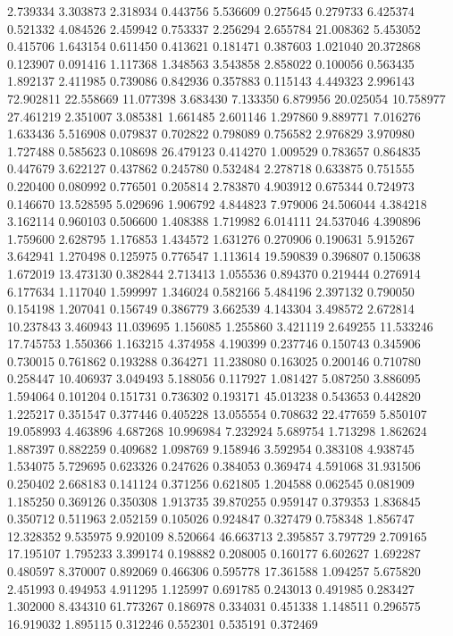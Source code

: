 2.739334
3.303873
2.318934
0.443756
5.536609
0.275645
0.279733
6.425374
0.521332
4.084526
2.459942
0.753337
2.256294
2.655784
21.008362
5.453052
0.415706
1.643154
0.611450
0.413621
0.181471
0.387603
1.021040
20.372868
0.123907
0.091416
1.117368
1.348563
3.543858
2.858022
0.100056
0.563435
1.892137
2.411985
0.739086
0.842936
0.357883
0.115143
4.449323
2.996143
72.902811
22.558669
11.077398
3.683430
7.133350
6.879956
20.025054
10.758977
27.461219
2.351007
3.085381
1.661485
2.601146
1.297860
9.889771
7.016276
1.633436
5.516908
0.079837
0.702822
0.798089
0.756582
2.976829
3.970980
1.727488
0.585623
0.108698
26.479123
0.414270
1.009529
0.783657
0.864835
0.447679
3.622127
0.437862
0.245780
0.532484
2.278718
0.633875
0.751555
0.220400
0.080992
0.776501
0.205814
2.783870
4.903912
0.675344
0.724973
0.146670
13.528595
5.029696
1.906792
4.844823
7.979006
24.506044
4.384218
3.162114
0.960103
0.506600
1.408388
1.719982
6.014111
24.537046
4.390896
1.759600
2.628795
1.176853
1.434572
1.631276
0.270906
0.190631
5.915267
3.642941
1.270498
0.125975
0.776547
1.113614
19.590839
0.396807
0.150638
1.672019
13.473130
0.382844
2.713413
1.055536
0.894370
0.219444
0.276914
6.177634
1.117040
1.599997
1.346024
0.582166
5.484196
2.397132
0.790050
0.154198
1.207041
0.156749
0.386779
3.662539
4.143304
3.498572
2.672814
10.237843
3.460943
11.039695
1.156085
1.255860
3.421119
2.649255
11.533246
17.745753
1.550366
1.163215
4.374958
4.190399
0.237746
0.150743
0.345906
0.730015
0.761862
0.193288
0.364271
11.238080
0.163025
0.200146
0.710780
0.258447
10.406937
3.049493
5.188056
0.117927
1.081427
5.087250
3.886095
1.594064
0.101204
0.151731
0.736302
0.193171
45.013238
0.543653
0.442820
1.225217
0.351547
0.377446
0.405228
13.055554
0.708632
22.477659
5.850107
19.058993
4.463896
4.687268
10.996984
7.232924
5.689754
1.713298
1.862624
1.887397
0.882259
0.409682
1.098769
9.158946
3.592954
0.383108
4.938745
1.534075
5.729695
0.623326
0.247626
0.384053
0.369474
4.591068
31.931506
0.250402
2.668183
0.141124
0.371256
0.621805
1.204588
0.062545
0.081909
1.185250
0.369126
0.350308
1.913735
39.870255
0.959147
0.379353
1.836845
0.350712
0.511963
2.052159
0.105026
0.924847
0.327479
0.758348
1.856747
12.328352
9.535975
9.920109
8.520664
46.663713
2.395857
3.797729
2.709165
17.195107
1.795233
3.399174
0.198882
0.208005
0.160177
6.602627
1.692287
0.480597
8.370007
0.892069
0.466306
0.595778
17.361588
1.094257
5.675820
2.451993
0.494953
4.911295
1.125997
0.691785
0.243013
0.491985
0.283427
1.302000
8.434310
61.773267
0.186978
0.334031
0.451338
1.148511
0.296575
16.919032
1.895115
0.312246
0.552301
0.535191
0.372469
